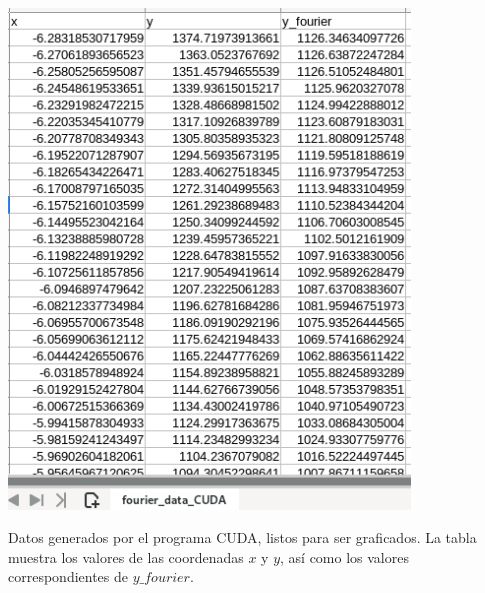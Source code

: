 \begin{table}
    \includegraphics[width=0.8\textwidth]{media/tabla_cuda.png}
    \caption{Datos generados por el programa CUDA, listos para ser graficados. La tabla muestra los valores de las coordenadas \(x\) y \(y\), así como los valores correspondientes de \(y\_fourier\).}
    \label{tab:datos_cuda}
\end{table}